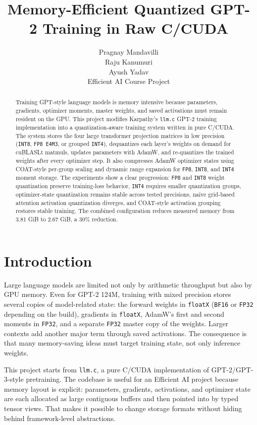 \documentclass{article}
\title{Memory-Efficient Quantized GPT-2 Training in Raw C/CUDA}
\author{%
  Pragnay Mandavilli \\
  Raju Kanumuri \\
  Ayush Yadav \\
  Efficient AI Course Project
}
\begin{document}
\maketitle

\begin{abstract}
Training GPT-style language models is memory intensive because parameters, gradients,
optimizer moments, master weights, and saved activations must remain resident on the GPU.
This project modifies Karpathy's \texttt{llm.c} GPT-2 training implementation into a
quantization-aware training system written in pure C/CUDA. The system stores the four large
transformer projection matrices in low precision (\texttt{INT8}, \texttt{FP8 E4M3}, or
grouped \texttt{INT4}), dequantizes each layer's weights on demand for cuBLASLt matmuls,
updates parameters with AdamW, and re-quantizes the trained weights after every optimizer
step. It also compresses AdamW optimizer states using COAT-style per-group scaling and
dynamic range expansion for \texttt{FP8}, \texttt{INT8}, and \texttt{INT4} moment storage.
The experiments show a clear progression: \texttt{FP8} and \texttt{INT8} weight
quantization preserve training-loss behavior, \texttt{INT4} requires smaller quantization
groups, optimizer-state quantization remains stable across tested precisions, naive
grid-based attention activation quantization diverges, and COAT-style activation grouping restores
stable training. The combined configuration reduces measured memory from 3.81 GiB to
2.67 GiB, a 30\% reduction.
\end{abstract}

\section{Introduction}

Large language models are limited not only by arithmetic throughput but also by GPU memory.
Even for GPT-2 124M, training with mixed precision stores several copies of model-related
state: the forward weights in \texttt{floatX} (\texttt{BF16} or \texttt{FP32} depending on
the build), gradients in \texttt{floatX}, AdamW's first and second moments in \texttt{FP32},
and a separate \texttt{FP32} master copy of the weights. Larger contexts add another major
term through saved activations. The consequence is that many memory-saving ideas must target
training state, not only inference weights.

This project starts from \texttt{llm.c}, a pure C/CUDA implementation of GPT-2/GPT-3-style
pretraining. The codebase is useful for an Efficient AI project because memory layout is
explicit: parameters, gradients, activations, and optimizer state are each allocated as large
contiguous buffers and then pointed into by typed tensor views. That makes it possible to
change storage formats without hiding behind framework-level abstractions.
\end{document}
